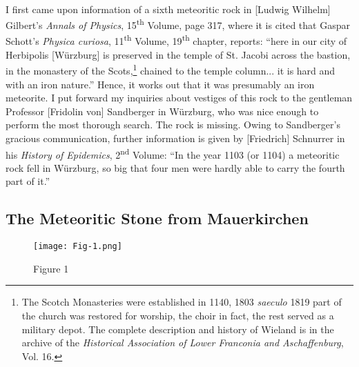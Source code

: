 \documentclass[a4paper, 12pt, oneside]{article}
\begin{document}
\paragraph{}
I first came upon information of a sixth meteoritic rock in [Ludwig Wilhelm] Gilbert's \emph{Annals of Physics}, 15\textsuperscript{th} Volume, page 317, where it is cited that Gaspar Schott's \emph{Physica curiosa}, 11\textsuperscript{th} Volume, 19\textsuperscript{th} chapter, reports: ``here in our city of Herbipolis [Würzburg] is preserved in the temple of St. Jacobi across the bastion, in the monastery of the Scots,\footnote{The Scotch Monasteries were established in 1140, 1803 \emph{saeculo} 1819 part of the church was restored for worship, the choir in fact, the rest served as a military depot. The complete description and history of Wieland is in the archive of the \emph{Historical Association of Lower Franconia and Aschaffenburg}, Vol. 16.} chained to the temple column... it is hard and with an iron nature.'' Hence, it works out that it was presumably an iron meteorite. I put forward my inquiries about vestiges of this rock to the gentleman Professor [Fridolin von] Sandberger in Würzburg, who was nice enough to perform the most thorough search. The rock is missing. Owing to Sandberger's gracious communication, further information is given by [Friedrich] Schnurrer in his \emph{History of Epidemics}, 2\textsuperscript{nd} Volume: ``In the year 1103 (or 1104) a meteoritic rock fell in Würzburg, so big that four men were hardly able to carry the fourth part of it.''
\clearpage
\subsection{The Meteoritic Stone from Mauerkirchen}
\begin{figure}[h]
\centering
\texttt{[image: Fig-1.png]}
\caption{Figure 1}
\end{figure}
\end{document}
